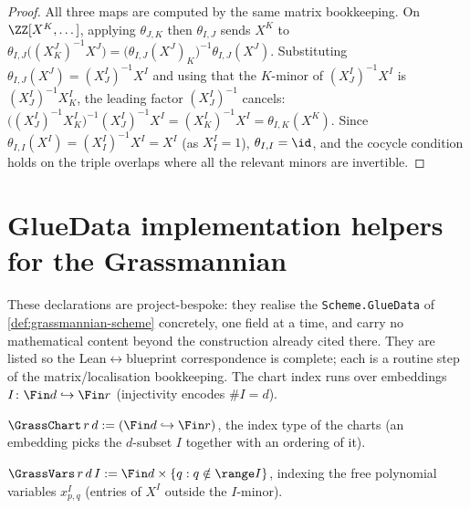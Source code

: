\begin{proof}  
  All three maps are computed by the same matrix bookkeeping. On
  $\ZZ[X^K,\dots]$, applying $\theta_{J,K}$ then $\theta_{I,J}$ sends $X^K$ to
  $\theta_{I,J}\big((X^J_K)^{-1}X^J\big) = \big(\theta_{I,J}(X^J)_K\big)^{-1}
  \theta_{I,J}(X^J)$. Substituting $\theta_{I,J}(X^J) = (X^I_J)^{-1}X^I$ and
  using that the $K$-minor of $(X^I_J)^{-1}X^I$ is $(X^I_J)^{-1}X^I_K$, the
  leading factor $(X^I_J)^{-1}$ cancels:
  $\big((X^I_J)^{-1}X^I_K\big)^{-1}(X^I_J)^{-1}X^I = (X^I_K)^{-1}X^I =
  \theta_{I,K}(X^K)$. Since $\theta_{I,I}(X^I) = (X^I_I)^{-1}X^I = X^I$ (as
  $X^I_I = 1$), $\theta_{I,I} = \id$, and the cocycle condition holds on the
  triple overlaps where all the relevant minors are invertible.
\end{proof}

\section{GlueData implementation helpers for the Grassmannian}

These declarations are project-bespoke: they realise the
\texttt{Scheme.GlueData} of \cref{def:grassmannian-scheme} concretely, one field
at a time, and carry no mathematical content beyond the construction already
cited there. They are listed so the Lean$\leftrightarrow$blueprint
correspondence is complete; each is a routine step of the matrix/localisation
bookkeeping. The chart index runs over embeddings $I\colon\Fin d\hookrightarrow
\Fin r$ (injectivity encodes $\#I = d$).

\begin{definition}
  \label{def:grass-chart}
  $\GrassChart\,r\,d := (\Fin d\hookrightarrow\Fin r)$, the index type of the
  charts (an embedding picks the $d$-subset $I$ together with an ordering of it).
\end{definition}

\begin{definition}
  \label{def:grass-vars}
  $\GrassVars\,r\,d\,I := \Fin d\times\{q : q\notin\range I\}$, indexing the
  free polynomial variables $x^I_{p,q}$ (entries of $X^I$ outside the $I$-minor).
\end{definition}


